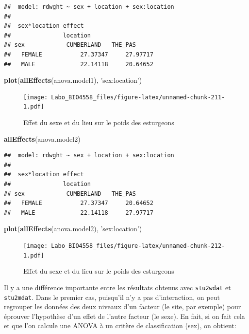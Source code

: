 \documentclass[12pt,]{book}
\newenvironment{Shaded}{\begin{snugshade}}{\end{snugshade}}
\newcommand{\KeywordTok}[1]{\textcolor[rgb]{0.27,0.27,0.27}{\textbf{#1}}}
\newcommand{\NormalTok}[1]{#1}
\newcommand{\StringTok}[1]{\textcolor[rgb]{0.5,0.5,0.5}{#1}}
\begin{document}
\begin{verbatim}
##  model: rdwght ~ sex + location + sex:location
## 
##  sex*location effect
##               location
## sex            CUMBERLAND   THE_PAS     
##   FEMALE           27.37347     27.97717
##   MALE             22.14118     20.64652
\end{verbatim}

\begin{Shaded}
\begin{Highlighting}[]
\KeywordTok{plot}\NormalTok{(}\KeywordTok{allEffects}\NormalTok{(anova.model1), }\StringTok{'sex:location'}\NormalTok{)}
\end{Highlighting}
\end{Shaded}

\begin{figure}
\centering
\texttt{[image: Labo\_BIO4558\_files/figure-latex/unnamed-chunk-211-1.pdf]}
\caption{\label{fig:unnamed-chunk-211}Effet du sexe et du lieu sur le poids des esturgeons}
\end{figure}

\begin{Shaded}
\begin{Highlighting}[]
\KeywordTok{allEffects}\NormalTok{(anova.model2)}
\end{Highlighting}
\end{Shaded}

\begin{verbatim}
##  model: rdwght ~ sex + location + sex:location
## 
##  sex*location effect
##               location
## sex            CUMBERLAND   THE_PAS     
##   FEMALE           27.37347     20.64652
##   MALE             22.14118     27.97717
\end{verbatim}

\begin{Shaded}
\begin{Highlighting}[]
\KeywordTok{plot}\NormalTok{(}\KeywordTok{allEffects}\NormalTok{(anova.model2), }\StringTok{'sex:location'}\NormalTok{)}
\end{Highlighting}
\end{Shaded}

\begin{figure}
\centering
\texttt{[image: Labo\_BIO4558\_files/figure-latex/unnamed-chunk-212-1.pdf]}
\caption{\label{fig:unnamed-chunk-212}Effet du sexe et du lieu sur le poids des esturgeons}
\end{figure}

Il y a une différence importante entre les résultats obtenus avec \texttt{stu2wdat} et \texttt{stu2mdat}. Dans le premier cas, puisqu'il n'y a pas d'interaction, on peut regrouper les données des deux niveaux d'un facteur (le site, par exemple) pour éprouver l'hypothèse d'un effet de l'autre facteur (le sexe). En fait, si on fait cela et que l'on calcule une ANOVA à un critère de classification (sex), on obtient:
\end{document}
